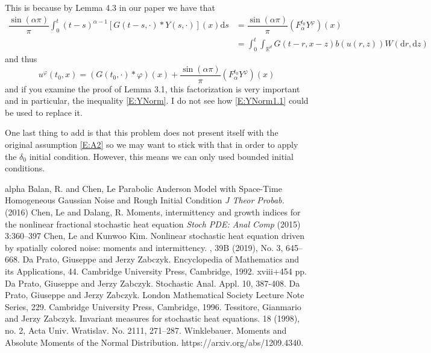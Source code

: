 \documentclass{article}
\numberwithin{equation}{section}
\newcommand{\R}{\mathbb{R}}
\newcommand{\ud}{\ensuremath{\mathrm{d}}}
\begin{document}
This is because by Lemma 4.3 in our paper we have that 
	\begin{align*}
		\dfrac{\sin(\alpha \pi)}{\pi}\int_0^t(t-s)^{\alpha-1}\left[G(t-s,\cdot)*Y(s,\cdot)\right](x) \ud s &=	\dfrac{\sin(\alpha \pi)}{\pi}\left(F_{\alpha}^{t_0}Y^{\varphi}\right)(x)
		\\&= \int_0^t  \int_{\R^d} G(t-r,x-z)b(u(r,z)) W(\ud r,\ud z)
	\end{align*}
and thus 
	\[
		u^\varphi(t_0,x) = (G(t_0,\cdot) * \varphi)(x) + \dfrac{\sin(\alpha \pi)}{\pi}\left(F_{\alpha}^{t_0}Y^{\varphi}\right)(x)
	\]
and if you examine the proof of Lemma 3.1, this factorization is very important and in particular, the inequality \eqref{E:YNorm}. I do not see how \eqref{E:YNorm1.1} could be used to replace it. 

One last thing to add is that this problem does not present itself with the original assumption \eqref{E:A2} so we may want to stick with that in order to apply the $\delta_0$ initial condition. However, this means we can only used bounded initial conditions. 
\begin{small}%
	\begin{thebibliography}{alpha}
		Balan, R. and Chen, Le
		\newblock Parabolic Anderson Model with Space-Time Homogeneous Gaussian Noise and Rough Initial Condition
		\newblock \textit{J Theor Probab.} (2016)
		Chen, Le and Dalang, R.
		\newblock Moments, intermittency and growth indices for the
		nonlinear fractional stochastic heat equation
		\newblock \textit{Stoch PDE: Anal Comp} (2015) 3:360–397
		Chen, Le and Kunwoo Kim.
		\newblock Nonlinear stochastic heat equation driven by spatially colored noise: moments and intermittency.
		, 39B (2019), No. 3, 645--668.
		Da Prato, Giuseppe and Jerzy Zabczyk.
		Encyclopedia of Mathematics and its Applications, 44. Cambridge University Press, Cambridge, 1992. xviii+454 pp.
		Da Prato, Giuseppe and Jerzy Zabczyk.
		Stochastic Anal. Appl. 10, 387-408.
		Da Prato, Giuseppe and Jerzy Zabczyk.
		\newblock London Mathematical Society Lecture Note Series, 229. Cambridge University Press, Cambridge, 1996.
		Tessitore, Gianmario and Jerzy Zabczyk.
		\newblock Invariant measures for stochastic heat equations.
		 18 (1998), no. 2, Acta Univ. Wratislav. No. 2111, 271--287.
		Winklebauer.
		\newblock Moments and Absolute Moments of the
		Normal Distribution.
		 https://arxiv.org/abs/1209.4340.
	\end{thebibliography}
\end{small}
\end{document}
